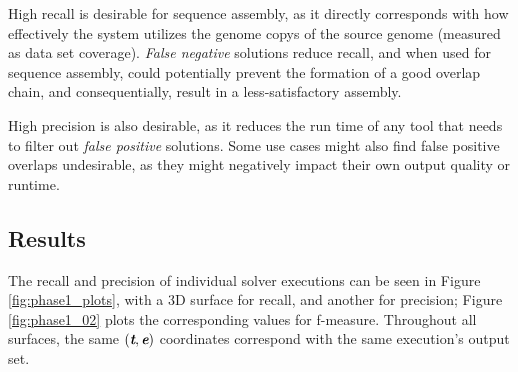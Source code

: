 High recall is desirable for sequence assembly, as it directly corresponds with how effectively the system utilizes the \glspl{genome copy} of the \gls{source genome} (measured as data set \gls{coverage}). \textit{False negative} solutions reduce recall, and when used for sequence assembly, could potentially prevent the formation of a good overlap chain, and consequentially, result in a less-satisfactory assembly.

High precision is also desirable, as it reduces the run time of any tool that needs to filter out \textit{false positive} solutions. Some use cases might also find false positive overlaps undesirable, as they might negatively impact their own output quality or runtime.


\FloatBarrier

\subsection{Results}
The recall and precision of individual \aspop{} solver executions can be seen in Figure \ref{fig:phase1_plots}, with a 3D surface for recall, and another for precision; Figure \ref{fig:phase1_02} plots the corresponding values for f-measure. Throughout all surfaces, the same $(\textit{\textbf{t}}, \textit{\textbf{e}})$ coordinates correspond with the same execution's output set.


